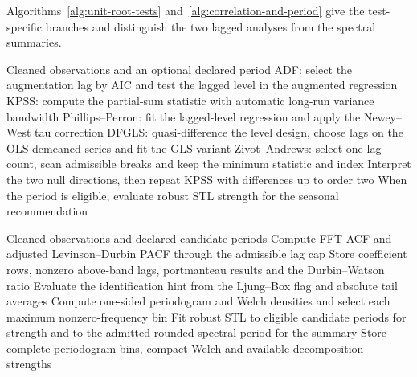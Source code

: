 Algorithms~\ref{alg:unit-root-tests} and~\ref{alg:correlation-and-period}
give the test-specific branches and distinguish the two lagged analyses
from the spectral summaries.
\begin{algorithm}[htbp]
\caption{Compute the stationarity decisions and differencing recommendations from one finite cleaned series.}
\label{alg:unit-root-tests}
\begin{algorithmic}[1]
\Require Cleaned observations and an optional declared period
\State ADF: select the augmentation lag by AIC and test the lagged level in the augmented regression
\State KPSS: compute the partial-sum statistic with automatic long-run variance bandwidth
\State Phillips--Perron: fit the lagged-level regression and apply the Newey--West tau correction
\State DFGLS: quasi-difference the level design, choose lags on the OLS-demeaned series and fit the GLS variant
\State Zivot--Andrews: select one lag count, scan admissible breaks and keep the minimum statistic and index
\State Interpret the two null directions, then repeat KPSS with differences up to order two
\State When the period is eligible, evaluate robust STL strength for the seasonal recommendation
\end{algorithmic}
\end{algorithm}

\begin{algorithm}[htbp]
\caption{Compute lag statistics and period summaries on the cleaned observation axis using the declared defaults.}
\label{alg:correlation-and-period}
\begin{algorithmic}[1]
\Require Cleaned observations and declared candidate periods
\State Compute FFT ACF and adjusted Levinson--Durbin PACF through the admissible lag cap
\State Store coefficient rows, nonzero above-band lags, portmanteau results and the Durbin--Watson ratio
\State Evaluate the identification hint from the Ljung--Box flag and absolute tail averages
\State Compute one-sided periodogram and Welch densities and select each maximum nonzero-frequency bin
\State Fit robust STL to eligible candidate periods for strength and to the admitted rounded spectral period for the summary
\State Store complete periodogram bins, compact Welch and available decomposition strengths
\end{algorithmic}
\end{algorithm}

